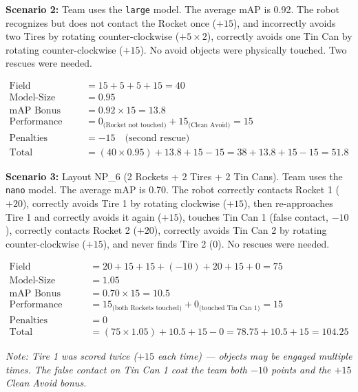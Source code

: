 \documentclass[a4]{article}
\begin{document}
\textbf{Scenario 2:} Team uses the \texttt{large} model. The average mAP is 0.92. The robot recognizes but does not contact the Rocket once ($+15$), and incorrectly avoids two Tires by rotating counter-clockwise ($+5 \times 2$), correctly avoids one Tin Can by rotating counter-clockwise ($+15$). No avoid objects were physically touched. Two rescues were needed.

\begin{align*}
\text{Field Performance} &= 15 + 5 + 5 + 15 = 40 \\
\text{Model-Size Multiplier} &= 0.95 \\
\text{mAP Bonus} &= 0.92 \times 15 = 13.8 \\
\text{Performance Bonus} &= 0_{\text{(Rocket not touched)}} + 15_{\text{(Clean Avoid)}} = 15 \\
\text{Penalties} &= -15 \quad \text{(second rescue)} \\
\text{Total} &= (40 \times 0.95) + 13.8 + 15 - 15 = 38 + 13.8 + 15 - 15 = \mathbf{51.8}
\end{align*}

\textbf{Scenario 3:} Layout NP\_6 (2 Rockets + 2 Tires + 2 Tin Cans). Team uses the \texttt{nano} model. The average mAP is 0.70. The robot correctly contacts Rocket 1 ($+20$), correctly avoids Tire 1 by rotating clockwise ($+15$), then re-approaches Tire 1 and correctly avoids it again ($+15$), touches Tin Can 1 (false contact, $-10$), correctly contacts Rocket 2 ($+20$), correctly avoids Tin Can 2 by rotating counter-clockwise ($+15$), and never finds Tire 2 ($0$). No rescues were needed.

\begin{align*}
\text{Field Performance} &= 20 + 15 + 15 + (-10) + 20 + 15 + 0 = 75 \\
\text{Model-Size Multiplier} &= 1.05 \\
\text{mAP Bonus} &= 0.70 \times 15 = 10.5 \\
\text{Performance Bonus} &= 15_{\text{(both Rockets touched)}} + 0_{\text{(touched Tin Can 1)}} = 15 \\
\text{Penalties} &= 0 \\
\text{Total} &= (75 \times 1.05) + 10.5 + 15 - 0 = 78.75 + 10.5 + 15 = \mathbf{104.25}
\end{align*}

\textit{Note: Tire 1 was scored twice ($+15$ each time) --- objects may be engaged multiple times. The false contact on Tin Can 1 cost the team both $-10$ points and the $+15$ Clean Avoid bonus.}
\end{document}
